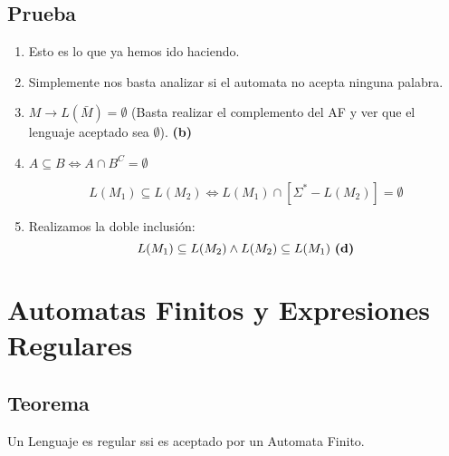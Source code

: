 \subsection*{Prueba}
\begin{enumerate}[label=\textbf{\alph*)}]
\item Esto es lo que ya hemos ido haciendo.
\item Simplemente nos basta analizar si el automata no acepta ninguna palabra.
\item $M \rightarrow L(\bar{M})=\emptyset$ (Basta realizar el complemento del AF y ver que el lenguaje aceptado sea $\emptyset$). \textbf{(b)}
\item $A\subseteq B \Leftrightarrow A \cap B ^C = \emptyset$
\begin{center}
\def\firstcircle{(0,0) circle (1.5cm)}
\def\secondcircle{(0,0) circle (0.5cm)}


\end{center}
$$
L(M_1)\subseteq L(M_2) \Leftrightarrow L(M_1) \cap [\Sigma^* - L(M_2)] = \emptyset
$$
\item Realizamos la doble inclusión:
$$
L(M_1)\subseteq L(M_2) \wedge L(M_2)\subseteq L(M_1) \text{  \textbf{(d)}}
$$
\end{enumerate}


\section{Automatas Finitos y Expresiones Regulares}
\subsection*{Teorema}
Un Lenguaje es regular ssi es aceptado por un Automata Finito.
